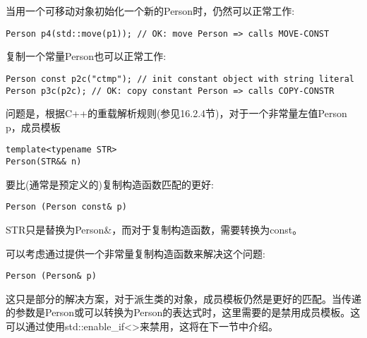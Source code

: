 当用一个可移动对象初始化一个新的Person时，仍然可以正常工作:

\begin{lstlisting}[style=styleCXX]
Person p4(std::move(p1)); // OK: move Person => calls MOVE-CONST
\end{lstlisting}

复制一个常量Person也可以正常工作:

\begin{lstlisting}[style=styleCXX]
Person const p2c("ctmp"); // init constant object with string literal
Person p3c(p2c); // OK: copy constant Person => calls COPY-CONSTR
\end{lstlisting}

问题是，根据C++的重载解析规则(参见16.2.4节)，对于一个非常量左值Person p，成员模板

\begin{lstlisting}[style=styleCXX]
template<typename STR>
Person(STR&& n)
\end{lstlisting}

要比(通常是预定义的)复制构造函数匹配的更好:

\begin{lstlisting}[style=styleCXX]
Person (Person const& p)
\end{lstlisting}

STR只是替换为Person\&，而对于复制构造函数，需要转换为const。

可以考虑通过提供一个非常量复制构造函数来解决这个问题:

\begin{lstlisting}[style=styleCXX]
Person (Person& p)
\end{lstlisting}

这只是部分的解决方案，对于派生类的对象，成员模板仍然是更好的匹配。当传递的参数是Person或可以转换为Person的表达式时，这里需要的是禁用成员模板。这可以通过使用std::enable\_if<>来禁用，这将在下一节中介绍。
































